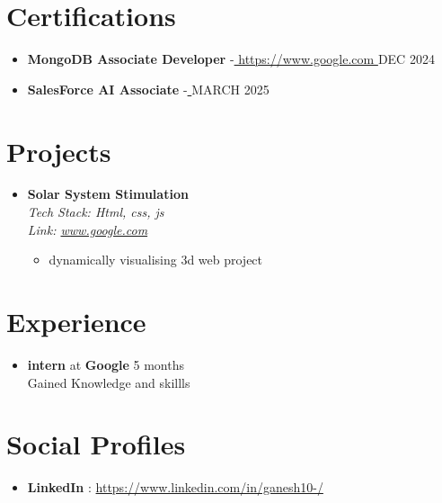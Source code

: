 \documentclass[a4paper,10pt]{article}
\begin{document}
\section*{Certifications}
\begin{itemize}[leftmargin=*]
  
    \item \textbf{ MongoDB Associate Developer } {-}\href{ https://www.google.com }{ https://www.google.com } \hfill{ DEC 2024 }
  
    \item \textbf{ SalesForce AI Associate } {-}\href{  }{  } \hfill{ MARCH 2025 }
  
\end{itemize}



\section*{Projects}
\begin{itemize}[leftmargin=*]
  
    \item \textbf{ Solar System Stimulation }\\
    \textit{Tech Stack: Html, css, js }%
    \\
    \textit{Link: \href{ www.google.com }{ www.google.com }}%
    

    \vspace{-0.5em} %
    \begin{itemize}[leftmargin=1.5em, itemsep=0pt, topsep=0pt]
      
        \item dynamically visualising 3d web project
      
    \end{itemize}
    \vspace{-0.5em} %
  
\end{itemize}




\section*{Experience}
\begin{itemize}[leftmargin=*]
    
    \item \textbf{ intern } at \textbf{ Google } \hfill 5 months \\
    Gained Knowledge and skillls
    
\end{itemize}



\section*{Social Profiles}
\begin{itemize}[leftmargin=*]
  
    \item \textbf{ LinkedIn }: \href{ https://www.linkedin.com/in/ganesh10-/ }{ https://www.linkedin.com/in/ganesh10-/ }
  
\end{itemize}
\end{document}
